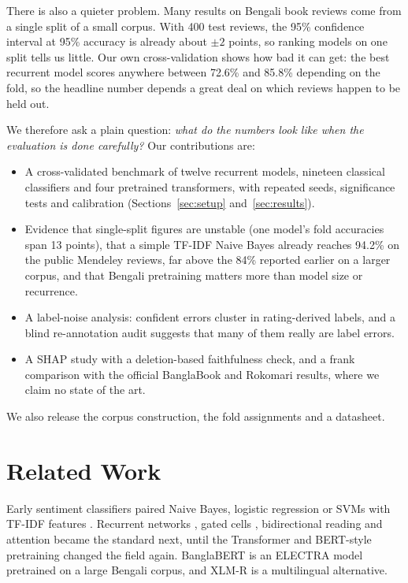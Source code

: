 \documentclass[conference,a4paper]{IEEEtran}
\begin{document}
There is also a quieter problem. Many results on Bengali book reviews come from a single split of a small corpus. With 400 test reviews, the 95\% confidence interval at 95\% accuracy is already about $\pm 2$ points, so ranking models on one split tells us little. Our own cross-validation shows how bad it can get: the best recurrent model scores anywhere between 72.6\% and 85.8\% depending on the fold, so the headline number depends a great deal on which reviews happen to be held out.

We therefore ask a plain question: \emph{what do the numbers look like when the evaluation is done carefully?} Our contributions are:
\begin{itemize}
\item A cross-validated benchmark of twelve recurrent models, nineteen classical classifiers and four pretrained transformers, with repeated seeds, significance tests and calibration (Sections~\ref{sec:setup} and~\ref{sec:results}).
\item Evidence that single-split figures are unstable (one model's fold accuracies span 13 points), that a simple TF-IDF Naive Bayes already reaches 94.2\% on the public Mendeley reviews, far above the 84\% reported earlier on a larger corpus, and that Bengali pretraining matters more than model size or recurrence.
\item A label-noise analysis: confident errors cluster in rating-derived labels, and a blind re-annotation audit suggests that many of them really are label errors.
\item A SHAP study with a deletion-based faithfulness check, and a frank comparison with the official BanglaBook and Rokomari results, where we claim no state of the art.
\end{itemize}
We also release the corpus construction, the fold assignments and a datasheet.

\section{Related Work}
Early sentiment classifiers paired Naive Bayes, logistic regression or SVMs with TF-IDF features \cite{pang2002}. Recurrent networks \cite{mikolov2010}, gated cells \cite{hochreiter1997,cho2014}, bidirectional reading \cite{schuster1997} and attention \cite{bahdanau2015,wang2016} became the standard next, until the Transformer \cite{vaswani2017} and BERT-style pretraining \cite{devlin2019} changed the field again. BanglaBERT \cite{bhattacharjee2022} is an ELECTRA model pretrained on a large Bengali corpus, and XLM-R \cite{conneau2020} is a multilingual alternative.
\end{document}
